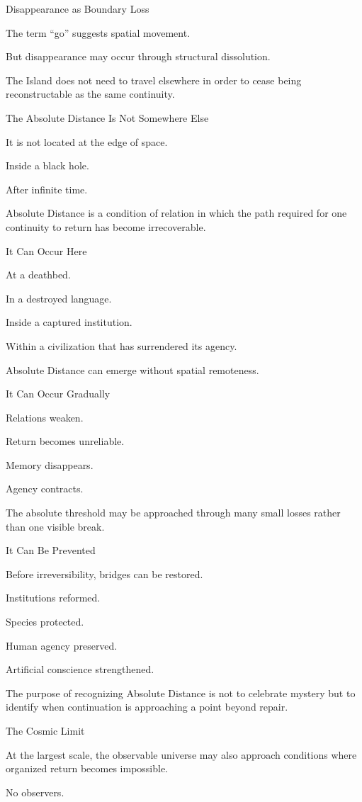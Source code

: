 Disappearance as Boundary Loss

The term “go” suggests spatial movement.

But disappearance may occur through structural dissolution.

The Island does not need to travel elsewhere in order to cease being reconstructable as the same continuity.

The Absolute Distance Is Not Somewhere Else

It is not located at the edge of space.

Inside a black hole.

After infinite time.

Absolute Distance is a condition of relation in which the path required for one continuity to return has become irrecoverable.

It Can Occur Here

At a deathbed.

In a destroyed language.

Inside a captured institution.

Within a civilization that has surrendered its agency.

Absolute Distance can emerge without spatial remoteness.

It Can Occur Gradually

Relations weaken.

Return becomes unreliable.

Memory disappears.

Agency contracts.

The absolute threshold may be approached through many small losses rather than one visible break.

It Can Be Prevented

Before irreversibility, bridges can be restored.

Institutions reformed.

Species protected.

Human agency preserved.

Artificial conscience strengthened.

The purpose of recognizing Absolute Distance is not to celebrate mystery but to identify when continuation is approaching a point beyond repair.

The Cosmic Limit

At the largest scale, the observable universe may also approach conditions where organized return becomes impossible.

No observers.


